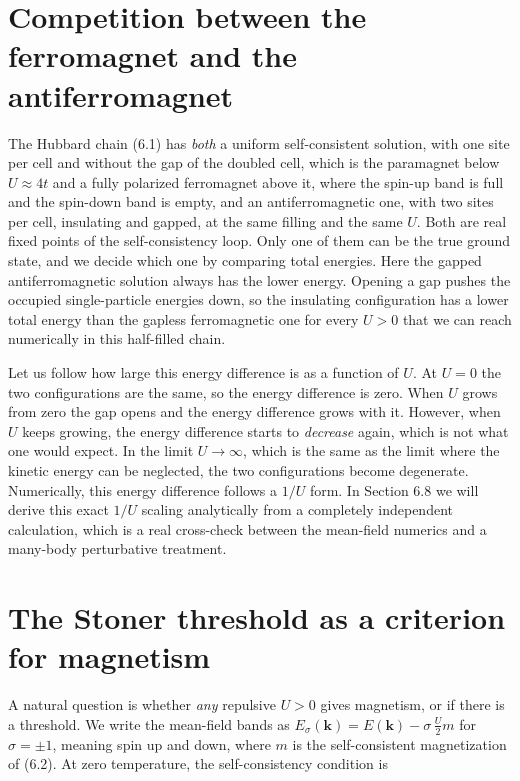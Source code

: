 \section{Competition between the ferromagnet and the antiferromagnet}

The Hubbard chain (6.1) has \emph{both} a uniform self-consistent solution, with one site per cell and
without the gap of the doubled cell, which is the paramagnet below $U\approx 4t$ and a fully polarized
ferromagnet above it, where the spin-up band is full and the spin-down band is empty, and an antiferromagnetic one, with two sites per cell, insulating and
gapped, at the same filling and the same $U$. Both are real fixed points of the self-consistency loop.
Only one of them can be the true ground state, and we decide which one by comparing total energies.
Here the gapped antiferromagnetic solution always has the lower energy. Opening a gap pushes the
occupied single-particle energies down, so the insulating configuration has a lower total energy than
the gapless ferromagnetic one for every $U>0$ that we can reach numerically in this half-filled chain.

Let us follow how large this energy difference is as a function of $U$. At $U=0$ the two
configurations are the same, so the energy difference is zero. When $U$ grows from zero the gap opens
and the energy difference grows with it. However, when $U$ keeps growing, the energy difference
starts to \emph{decrease} again, which is not what one would expect. In the limit $U\to\infty$, which
is the same as the limit where the kinetic energy can be neglected, the two configurations become
degenerate. Numerically, this energy difference follows a $1/U$ form. In Section 6.8 we will derive
this exact $1/U$ scaling analytically from a completely independent calculation, which is a real
cross-check between the mean-field numerics and a many-body perturbative treatment.

\section{The Stoner threshold as a criterion for magnetism}

A natural question is whether \emph{any} repulsive $U>0$ gives magnetism, or if there is a threshold.
We write the mean-field bands as $E_\sigma(\mathbf{k}) = E(\mathbf{k}) - \sigma\, \tfrac{U}{2}m$ for
$\sigma=\pm1$, meaning spin up and down, where $m$ is the self-consistent magnetization of (6.2). At
zero temperature, the self-consistency condition is

